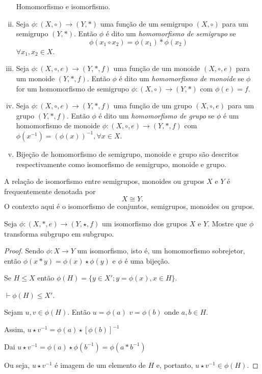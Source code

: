          \begin{definition}
            \begin{enumerate}[i.]
               Homomorfismo e isomorfismo.
               \item Seja $\phi: (X, \circ) \to (Y, *)$ uma função de um semigrupo $(X, \circ)$ para um semigrupo $(Y,*)$. Então $\phi$ é dito um \emph{homomorfismo de semigrupo} se $$\phi(x_{1}\circ x_{2}) = \phi(x_{1}) * \phi(x_{2})$$ $\forall x_{1},x_{2} \in X$.
               \item Seja $\phi: (X,\circ, e) \to (Y, *, f)$ uma função de um monoide $(X, \circ , e)$ para um monoide $(Y, *, f)$. Então $\phi$ é dito um \emph{homomorfismo de monoide} se $\phi$ for um homomorfismo de semigrupo $\phi: (X,\circ) \to (Y,*)$ com $\phi(e) = f$.
               \item Seja $\phi: (X,\circ , e) \to (Y, *, f)$ uma função de um grupo $(X,\circ, e)$ para um grupo $(Y, *, f)$. Então $\phi$ é dito um \emph{homomorfismo de grupo} se $\phi$ é um homomorfismo de monoide $\phi: (X,\circ, e) \to (Y, *, f)$ com $\phi(x^{-1}) = (\phi(x))^{-1}, \forall x \in X$.
               \item Bijeção de homomorfismo de semigrupo, monoide e grupo são descritos respectivamente como isomorfismo de semigrupo, monoide e grupo.
            \end{enumerate}
         \end{definition}
         A relação de isomorfismo entre semigrupos, monoides ou grupos $X$ e $Y$ é frequentemente denotada por $$X\cong Y.$$ O contexto aqui é o isomorfismo de conjuntos, semigrupos, monoides ou grupos.

         \begin{exmp}
            Seja $\phi:(X, *, e) \to (Y, \star, f)$ um isomorfismo dos grupos $X$ e $Y$. Mostre que $\phi$ transforma subgrupo em subgrupo.
            \begin{proof}
               Sendo $\phi: X \to Y$ um isomorfismo, isto é, um homomorfismo sobrejetor, então $\phi(x*y) = \phi(x) \star \phi(y)$ e $\phi$ é uma bijeção.

               Se $H \leq X$ então $\phi(H) = \{y \in X'; y = \phi(x), x\in H\}$.

               \quad $\vdash \phi(H) \leq X'$.

               Sejam $u,v \in \phi(H)$. Então $u = \phi(a)$ $v = \phi(b)$ onde $a,b \in H$.

               Assim, $u \star v^{-1} = \phi(a) \star [\phi(b)]^{-1}$

               Dai $u \star v^{-1} = \phi(a) \star \phi(b^{-1}) = \phi(a * b^{-1})$

               Ou seja, $u \star v^{-1}$ é imagem de um elemento de $H$ e, portanto, $u \star v^{-1} \in \phi(H)$.
            \end{proof}
         \end{exmp}


